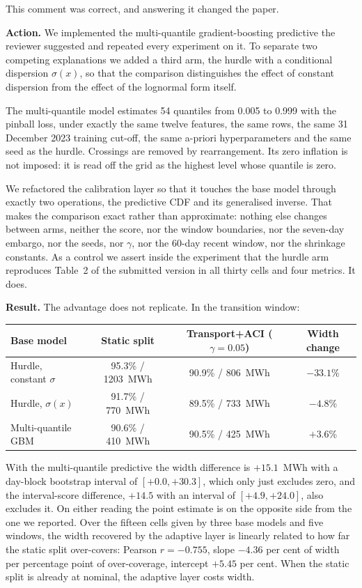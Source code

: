 \documentclass[11pt,a4paper]{article}
\newcommand{\action}[1]{\textbf{Action.} #1}
\begin{document}
This comment was correct, and answering it changed the paper.

\action{We implemented the multi-quantile gradient-boosting predictive the reviewer suggested and repeated every experiment on it. To separate two competing explanations we added a third arm, the hurdle with a conditional dispersion $\sigma(x)$, so that the comparison distinguishes the effect of constant dispersion from the effect of the lognormal form itself.}

The multi-quantile model estimates 54 quantiles from 0.005 to 0.999 with the pinball loss, under exactly the same twelve features, the same rows, the same 31 December 2023 training cut-off, the same a-priori hyperparameters and the same seed as the hurdle. Crossings are removed by rearrangement. Its zero inflation is not imposed: it is read off the grid as the highest level whose quantile is zero.

We refactored the calibration layer so that it touches the base model through exactly two operations, the predictive CDF and its generalised inverse. That makes the comparison exact rather than approximate: nothing else changes between arms, neither the score, nor the window boundaries, nor the seven-day embargo, nor the seeds, nor $\gamma$, nor the 60-day recent window, nor the shrinkage constants. As a control we assert inside the experiment that the hurdle arm reproduces Table~2 of the submitted version in all thirty cells and four metrics. It does.

\textbf{Result.} The advantage does not replicate. In the transition window:

\begin{center}
\begin{tabular}{@{}lccc@{}}
\toprule
Base model & Static split & Transport+ACI ($\gamma=0.05$) & Width change \\
\midrule
Hurdle, constant $\sigma$ & 95.3\% / 1203~MWh & 90.9\% / 806~MWh & $-33.1$\% \\
Hurdle, $\sigma(x)$ & 91.7\% / 770~MWh & 89.5\% / 733~MWh & $-4.8$\% \\
Multi-quantile GBM & 90.6\% / 410~MWh & 90.5\% / 425~MWh & $+3.6$\% \\
\bottomrule
\end{tabular}
\end{center}

With the multi-quantile predictive the width difference is $+15.1$~MWh with a day-block bootstrap interval of $[+0.0,+30.3]$, which only just excludes zero, and the interval-score difference, $+14.5$ with an interval of $[+4.9,+24.0]$, also excludes it. On either reading the point estimate is on the opposite side from the one we reported. Over the fifteen cells given by three base models and five windows, the width recovered by the adaptive layer is linearly related to how far the static split over-covers: Pearson $r=-0.755$, slope $-4.36$ per cent of width per percentage point of over-coverage, intercept $+5.45$ per cent. When the static split is already at nominal, the adaptive layer costs width.
\end{document}
